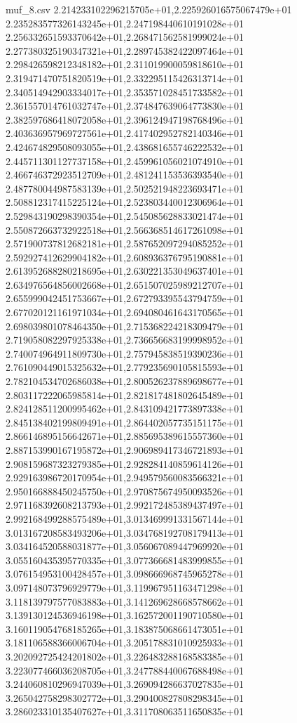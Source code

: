 \begin{filecontents*}{muf_8.csv}
2.214233102296215705e+01,2.225926016575067479e+01
2.235283577326143245e+01,2.247198440610191028e+01
2.256332651593370642e+01,2.268471562581999024e+01
2.277380325190347321e+01,2.289745382422097464e+01
2.298426598212348182e+01,2.311019900059818610e+01
2.319471470751820519e+01,2.332295115426313714e+01
2.340514942903334017e+01,2.353571028451733582e+01
2.361557014761032747e+01,2.374847639064773830e+01
2.382597686418072058e+01,2.396124947198768496e+01
2.403636957969727561e+01,2.417402952782140346e+01
2.424674829508093055e+01,2.438681655746222532e+01
2.445711301127737158e+01,2.459961056021074910e+01
2.466746372923512709e+01,2.481241153536393540e+01
2.487780044987583139e+01,2.502521948223693471e+01
2.508812317415225124e+01,2.523803440012306964e+01
2.529843190298390354e+01,2.545085628833021474e+01
2.550872663732922518e+01,2.566368514617261098e+01
2.571900737812682181e+01,2.587652097294085252e+01
2.592927412629904182e+01,2.608936376795190881e+01
2.613952688280218695e+01,2.630221353049637401e+01
2.634976564856002668e+01,2.651507025989212707e+01
2.655999042451753667e+01,2.672793395543794759e+01
2.677020121161971034e+01,2.694080461643170565e+01
2.698039801078464350e+01,2.715368224218309479e+01
2.719058082297925338e+01,2.736656683199998952e+01
2.740074964911809730e+01,2.757945838519390236e+01
2.761090449015325632e+01,2.779235690105815593e+01
2.782104534702686038e+01,2.800526237889698677e+01
2.803117222065985814e+01,2.821817481802645489e+01
2.824128511200995462e+01,2.843109421773897338e+01
2.845138402199809491e+01,2.864402057735151175e+01
2.866146895156642671e+01,2.885695389615557360e+01
2.887153990167195872e+01,2.906989417346721893e+01
2.908159687323279385e+01,2.928284140859614126e+01
2.929163986720170954e+01,2.949579560083566321e+01
2.950166888450245750e+01,2.970875674950093526e+01
2.971168392608213793e+01,2.992172485389437497e+01
2.992168499288575489e+01,3.013469991331567144e+01
3.013167208583493206e+01,3.034768192708179413e+01
3.034164520588031877e+01,3.056067089447969920e+01
3.055160435395770335e+01,3.077366681483999855e+01
3.076154953100428457e+01,3.098666968745965278e+01
3.097148073796929779e+01,3.119967951163471298e+01
3.118139797577083883e+01,3.141269628668578662e+01
3.139130124536946198e+01,3.162572001190710580e+01
3.160119054768185265e+01,3.183875068661473051e+01
3.181106588366006704e+01,3.205178831010925933e+01
3.202092725424201802e+01,3.226483288168583385e+01
3.223077466036208705e+01,3.247788440067688498e+01
3.244060810296947039e+01,3.269094286637027835e+01
3.265042758298302772e+01,3.290400827808298345e+01
3.286023310135407627e+01,3.311708063511650835e+01

\end{filecontents*}
